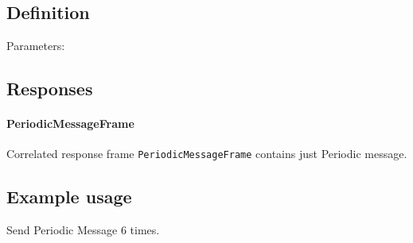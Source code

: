 \subsection{Definition}

Parameters: 

\begin{tcarglist}
\end{tcarglist}

\subsection{Responses}

\paragraph{PeriodicMessageFrame}
Correlated response frame \texttt{PeriodicMessageFrame} contains just Periodic message.

\subsection{Example usage}
Send Periodic Message 6 times.
